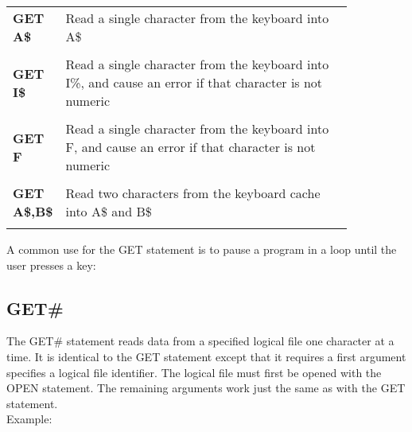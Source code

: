 \begin{tabular}{l p{0.85\linewidth}}

	{\ttfamily\bfseries GET A\$} & Read a single character from the keyboard into {\ttfamily A\$}\\\\

	{\ttfamily\bfseries GET I\$} & Read a single character from the keyboard
	into {\ttfamily I\%}, and cause an error if that character is not
	numeric\\\\

	{\ttfamily\bfseries GET F} & Read a single character from the keyboard into
	{\ttfamily F}, and cause an error if that character is not numeric\\\\

	{\ttfamily\bfseries GET A\$,B\$} & Read two characters from the keyboard
	cache into {\ttfamily A\$} and {\ttfamily B\$}\\\\

\end{tabular}

\vspace{16pt}

A common use for the {\ttfamily GET} statement is to pause a program in a loop until the user presses a key:\\


\subsection{GET\#}

The {\ttfamily GET\#} statement reads data from a specified logical file one
character at a time.  It is identical to the {\ttfamily GET} statement except
that it requires a first argument specifies a logical file identifier.  The
logical file must first be opened with the {\ttfamily OPEN} statement.  The
remaining arguments work just the same as with the {\ttfamily GET} statement.\\

Example:\\


